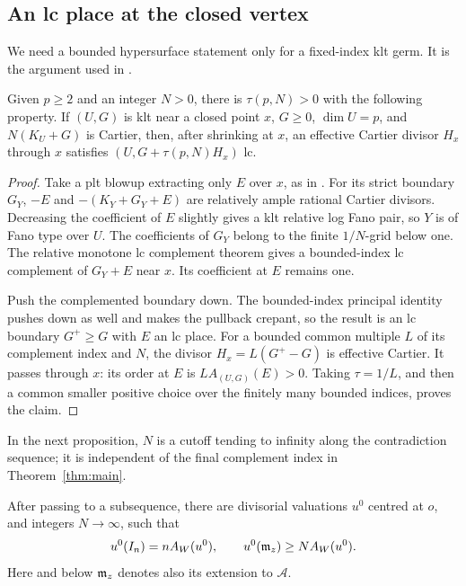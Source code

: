 \subsection{An lc place at the closed vertex}

We need a bounded hypersurface statement only for a fixed-index klt germ.
It is the argument used in \cite[proof of Proposition~5.1]{Chen}.

\begin{lemma}\label{a:index-hypersurface}
Given \(p\geq2\) and an integer \(N>0\), there is
\(\tau(p,N)>0\) with the following property. If \((U,G)\) is klt near a
closed point \(x\), \(G\geq0\), \(\dim U=p\), and \(N(K_U+G)\) is
Cartier, then, after shrinking at \(x\), an effective Cartier divisor
\(H_x\) through \(x\) satisfies \((U,G+\tau(p,N)H_x)\) lc.
\end{lemma}

\begin{proof}
Take a plt blowup extracting only \(E\) over \(x\), as in
\cite[Lemma~2.27]{Chen}. For its strict boundary \(G_Y\),
\(-E\) and \(-(K_Y+G_Y+E)\) are relatively ample rational Cartier
divisors. Decreasing the coefficient of \(E\) slightly gives a klt
relative log Fano pair, so \(Y\) is of Fano type over \(U\).
The coefficients of \(G_Y\) belong to the finite \(1/N\)-grid below one.
The relative monotone lc complement theorem
\cite[Theorem~1.8]{BirkarComplements} gives a bounded-index lc complement
of \(G_Y+E\) near \(x\). Its coefficient at \(E\) remains one.

Push the complemented boundary down. The bounded-index principal
identity pushes down as well and makes the pullback crepant, so the
result is an lc boundary \(G^+\geq G\) with \(E\) an lc place.
For a bounded common multiple \(L\) of its complement index and \(N\),
the divisor \(H_x=L(G^+-G)\) is effective Cartier.
It passes through \(x\): its order at \(E\) is
\(L A_{(U,G)}(E)>0\). Taking \(\tau=1/L\), and then a common smaller
positive choice over the finitely many bounded indices, proves the claim.
\end{proof}

In the next proposition, \(N\) is a cutoff tending to infinity along
the contradiction sequence; it is independent of the final complement
index in Theorem~\ref{thm:main}.

\begin{proposition}
\label{a:initial-lc-place}
After passing to a subsequence, there are divisorial valuations \(u^0\)
centred at \(o\), and integers \(N\to\infty\), such that
\begin{equation}
 u^0(I_n)=nA_W(u^0),\qquad
 u^0(\mathfrak m_z)\geq N A_W(u^0).
 \label{eq:A2}
\end{equation}
Here and below \(\mathfrak m_z\) denotes also its extension to \(\mathcal A\).
\end{proposition}

